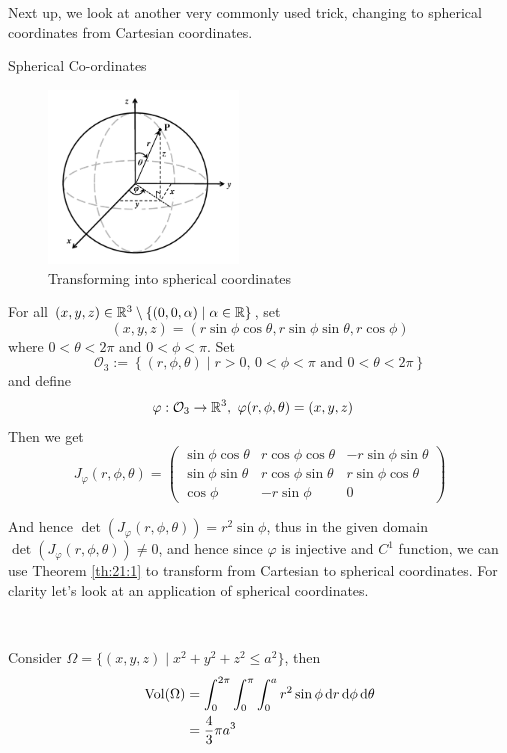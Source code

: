 \documentclass[../Analysis-3.tex]{subfiles}
\begin{document}
Next up, we look at another very commonly used trick, changing to spherical coordinates from Cartesian coordinates.

\begin{Eg}{Spherical Co-ordinates}{}
  \begin{figure}
    \centering
    \includegraphics[width=0.45\textwidth]{../figures/lec21.2.png}
    \caption{Transforming into spherical coordinates}
    \label{fig2:21}
  \end{figure}
  For all $(x,y,z) \in \mathbb{R}^3 \setminus \{ (0,0,\alpha) \mid \alpha \in \mathbb{R} \}$, set
  \[
    (x,y,z) = (r\sin\phi\cos\theta, r\sin\phi\sin\theta, r \cos\phi)
  \]
  where $0 < \theta < 2\pi$ and $0 < \phi < \pi$. Set
  \[
    \mathcal{O}_3 := \left\{ (r,\phi,\theta) \mid r >0, \, 0 < \phi < \pi \mbox{ and } 0 < \theta < 2\pi \right\}
  \]
  and define
  \begin{align*}
    \varphi : \mathcal{O}_3 & \to \mathbb{R}^3, \ \varphi(r,\phi,\theta) = (x,y,z)
  \end{align*}
  Then we get
  \[
    J_{\varphi}(r,\phi,\theta) = \begin{pmatrix}
      \sin\phi\cos\theta & r\cos\phi\cos\theta & -r\sin\phi\sin\theta \\
      \sin\phi\sin\theta & r\cos\phi\sin\theta & r\sin\phi\cos\theta  \\
      \cos\phi           & -r\sin\phi          & 0
    \end{pmatrix}
  \]


  And hence $\det(J_{\varphi}(r,\phi,\theta)) = r^2 \sin \phi$, thus in the given domain $\det(J_{\varphi}(r,\phi,\theta)) \neq 0$, and hence since $\varphi$ is injective and $C^1$ function, we can use Theorem \ref{th:21:1} to transform from Cartesian to spherical coordinates. For clarity let's look at an application of spherical coordinates.

  \

  Consider $\Omega = \{ (x,y,z) \mid x^2 + y^2 + z^2 \leq a^2 \}$, then
  \begin{align*}
    \operatorname{Vol}(\Omega) & = \int_0^{2\pi}\int_0^{\pi} \int_0^a r^2 \sin \phi \, \dd r \, \dd \phi \, \dd \theta \\
                 & = \frac{4}{3}\pi a^3
  \end{align*}
\end{Eg}
\end{document}
